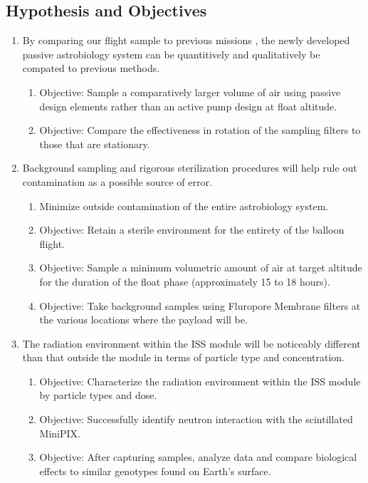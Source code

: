 \subsection{Hypothesis and Objectives}
\label{subsec:Hypothesis-Objectives}
\begin{enumerate}
\item By comparing our flight sample to previous missions \cite{SORA1}\cite{SORA2}, the newly developed passive astrobiology system can be quantitively and qualitatively be compated to previous methods.
  \begin{enumerate}
  \item Objective: Sample a comparatively larger volume of air using passive design elements rather than an active pump design at float altitude.
  \item Objective: Compare the effectiveness in rotation of the sampling filters to those that are stationary.
  \end{enumerate}
\item Background sampling and rigorous sterilization procedures will help rule out contamination as a possible source of error.
  \begin{enumerate}
  \item Minimize outside contamination of the entire astrobiology system.
  \item Objective: Retain a sterile environment for the entirety of the balloon flight.
  \item Objective: Sample a minimum volumetric amount of air at target altitude for the duration of the float phase (approximately 15 to 18 hours).
  \item Objective: Take background samples using Fluropore Membrane filters at the various locations where the payload will be.
  \end{enumerate}
\item The radiation environment within the ISS module will be noticeably different than that outside the module in terms of particle type and concentration. 
  \begin{enumerate}
  \item Objective: Characterize the radiation environment within the ISS module by particle types and dose.
  \item Objective: Successfully identify neutron interaction with the scintillated MiniPIX.
  \item Objective: After capturing samples, analyze data and compare biological effects to similar genotypes found on Earth's surface.
  \end{enumerate}

\end{enumerate}
